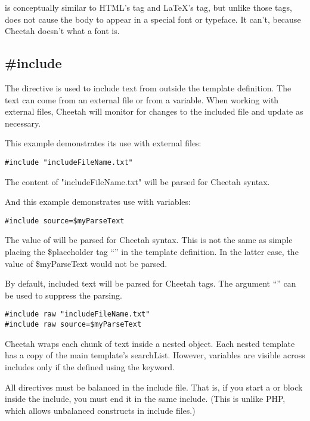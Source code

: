  is conceptually similar to HTML's  tag and LaTeX's
\code{\\verbatim\{\}} tag, but unlike those tags,  does not cause
the body to appear in a special font or typeface.  It can't, because Cheetah
doesn't what a font is.  


\subsection{\#include}
\label{output.include}

The  directive is  used to include text from outside the
template definition.  The text can come from an external file or from a
 variable.  When working with external files, Cheetah will
monitor for changes to the included file and update as necessary.  

This example demonstrates its use with external files:
\begin{verbatim}
#include "includeFileName.txt"
\end{verbatim}
The content of "includeFileName.txt" will be parsed for Cheetah syntax.

And this example demonstrates use with  variables:
\begin{verbatim}
#include source=$myParseText
\end{verbatim}
The value of  will be parsed for Cheetah syntax. This is not
the same as simple placing the \$placeholder tag ``'' in
the template definition.  In the latter case, the value of \$myParseText would
not be parsed.

By default, included text will be parsed for Cheetah tags.  The argument
``'' can be used to suppress the parsing.

\begin{verbatim}
#include raw "includeFileName.txt"
#include raw source=$myParseText
\end{verbatim}

Cheetah wraps each chunk of  text inside a nested
 object.  Each nested template has a copy of the main
template's searchList.  However,  variables are visible
across includes only if the defined using the  keyword.

All directives must be balanced in the include file.  That is, if you start
a  or  block inside the include, you must end it in
the same include.  (This is unlike PHP, which allows unbalanced constructs
in include files.)

